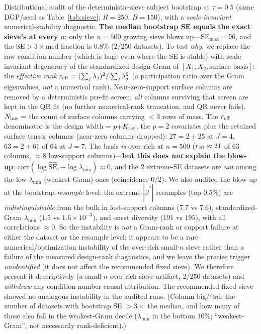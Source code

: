 \begin{table}[t]\centering\small
\caption{Distributional audit of the deterministic-sieve subject bootstrap at $\tau{=}0.5$ (same DGP/seed as Table~\ref{tab:sieve}; $R=250$, $B=150$), with a \emph{scale-invariant} numerical-stability diagnostic. \textbf{The median bootstrap SE equals the exact sieve's at every $n$}; only the $n{=}500$ growing sieve blows up---SE$_{\max}=96$, and the SE$>3\times$med fraction is $0.8\%$ ($2/250$ datasets). To test \emph{why}, we replace the raw condition number (which is huge even where the SE is stable) with scale-invariant degeneracy of the standardized design Gram of $[X_1,X_2,\text{surface basis}]$: the \emph{effective rank} $r_{\rm eff}=(\sum_j\lambda_j)^2/\sum_j\lambda_j^2$ (a participation ratio over the Gram eigenvalues, \emph{not} a numerical rank). Near-zero-support surface columns are removed by a deterministic pre-fit screen; \emph{all} columns surviving that screen are kept in the QR fit (no further numerical-rank truncation, and QR never fails). $N_{\rm low}=$ the count of surface columns carrying $<3$ rows of mass. The $r_{\rm eff}$ denominator is the design width $=p{+}K_{\rm ret}$, the $p{=}2$ covariates plus the retained surface tensor columns (near-zero columns dropped): $27{=}2{+}25$ at $J{=}4$, $63{=}2{+}61$ of $64$ at $J{=}7$. The basis \emph{is} over-rich at $n{=}500$ ($r_{\rm eff}\approx21$ of $63$ columns, $\approx8$ low-support columns)---\textbf{but this does \emph{not} explain the blow-up}: $\mathrm{corr}(\log\widehat{\mathrm{SE}},-\log\lambda_{\min})\approx0$, and the $2$ extreme-SE datasets are \emph{not} among the low-$\lambda_{\min}$ (weakest-Gram) ones (coincidence $0/2$). We also audited the blow-up at the bootstrap-\emph{resample} level: the extreme-$|\widehat\beta^*|$ resamples (top $0.5\%$) are \emph{indistinguishable} from the bulk in lost-support columns ($7.7$ vs $7.6$), standardized-Gram $\lambda_{\min}$ ($1.5$ vs $1.6{\times}10^{-3}$), and onset diversity ($191$ vs $195$), with all correlations $\approx0$. So the instability is \emph{not} a Gram-rank or support failure at either the dataset or the resample level; it appears to be a rare numerical/optimization instability of the over-rich small-$n$ sieve rather than a failure of the measured design-rank diagnostics, and we leave the precise trigger \emph{unidentified} (it does not affect the recommended fixed sieve). We therefore present it descriptively (a small-$n$ over-rich-sieve artifact, $2/250$ datasets) and \emph{withdraw} any condition-number causal attribution. The recommended fixed sieve showed no analogous instability in the audited runs. (Column big/$\cap$rd: the number of datasets with bootstrap SE $>3\times$ the median, and how many of those also fall in the weakest-Gram decile ($\lambda_{\min}$ in the bottom $10\%$; ``weakest-Gram'', not necessarily rank-deficient).)}

\end{table}
